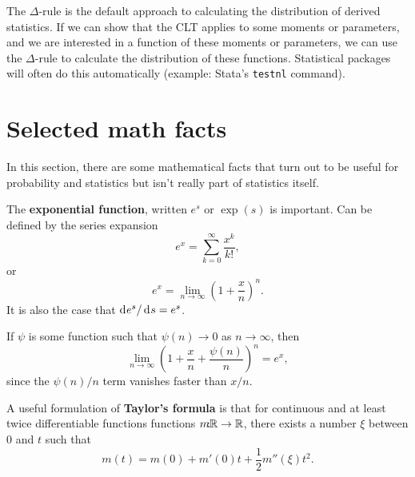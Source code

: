 \documentclass[twoside]{article}
\begin{document}
The $\Delta$-rule is the default approach to calculating the distribution of derived
statistics. If we can show that the CLT applies to some moments or parameters,
and we are interested in a function of these moments or parameters, we can use the 
$\Delta$-rule to calculate the distribution of these functions. Statistical packages
will often do this automatically (example: Stata's \texttt{testnl} command).

\section{Selected math facts}
In this section, there are some mathematical facts that turn out to be useful
for probability and statistics but isn't really part of statistics itself.

The \textbf{exponential function}, written $e^s$ or $\exp(s)$ is important. Can be defined by the
series expansion \[ e^x = \sum_{k=0}^\infty \frac{x^k}{k!},\] or
\[ e^x = \lim_{n\rightarrow \infty} \left( 1 + \frac{x}{n} \right)^n. \]
It is also the case that  $\rd e^s / \rd s =e^s$.


If $\psi$ is some function such that $\psi(n) \rightarrow 0$ as $n\rightarrow\infty$,
then \[ \lim_{n\rightarrow\infty} \left(1 + \frac{x}{n} + \frac{\psi(n)}{n}  \right)^n = e^x,\]
since the $\psi(n)/n$ term vanishes faster than $x/n$.

A useful formulation of \textbf{Taylor's formula} is that for continuous and at
least twice differentiable functions functions $m\!\!\!:\!\!\mathbb{R} \rightarrow \mathbb{R}$, there
exists a number $\xi$ between $0$ and $t$ such that \[ m(t) = m(0) + m'(0) t +
\frac{1}{2} m''(\xi) t^2.\]
\end{document}

